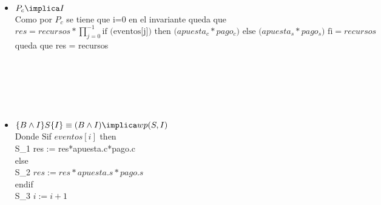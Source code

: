 \documentclass[10pt,a4paper]{article}
\begin{document}
\begin{itemize}
  \item $P_c \implica I$\\
   Como por $P_c$ se tiene que i=0 en el invariante queda que\\ $res = recursos*{\prod_{j=0}^{-1} \text{if (eventos[j]) then ($apuesta_c * pago_c$) else ($apuesta_s * pago_s$) fi}=recursos }$ \\ queda que res = recursos  \\ \\ \\ \\ \\ \\
  \item $\{B \land I\} S \{I\} \equiv (B \land  I) \implica wp(S, I)$\\
  Donde S\equiv if\hspace{0.1cm} $eventos[i]$ \hspace{0.1cm}then\\
  S_1 \hspace{1cm} res := res*apuesta.c*pago.c\\ else\\S_2  \hspace{1cm} $res := res*apuesta.s*pago.s$\\endif\\S_3 
\hspace{1cm} $i := i+1$ 
  

\end{itemize}
\end{document}

